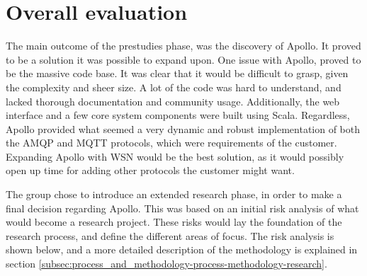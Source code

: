 \section{Overall evaluation}
\label{sec:prestudies-overall_evaluation}

The main outcome of the prestudies phase, was the discovery of Apollo. It proved to be a solution it was possible to expand upon. One issue with Apollo, proved to be the massive code base. It was clear that it would be difficult to grasp, given the complexity and sheer size. A lot of the code was hard to understand, and lacked thorough documentation and community usage. Additionally, the web interface and a few core system components were built using Scala. Regardless, Apollo provided what seemed a very dynamic and robust implementation of both the AMQP and MQTT protocols, which were requirements of the customer. Expanding Apollo with WSN would be the best solution, as it would possibly open up time for adding other protocols the customer might want.

The group chose to introduce an extended research phase, in order to make a final decision regarding Apollo. This was based on an initial risk analysis of what would become a research project. These risks would lay the foundation of the research process, and define the different areas of focus. The risk analysis is shown below, and a more detailed description of the methodology is explained in section \ref{subsec:process_and_methodology-process-methodology-research}.

\begin{table}[ht!]
\centering
{}
\caption{Risk analysis for building the system based on Apollo}
\label{tab:risk_analysis_apollo}
\end{table}

